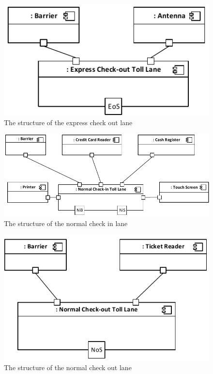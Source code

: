 \begin{figure}[H]
\centerline{\includegraphics[width=\textwidth]{img/composite_structure_diagrams/cscd_toll_lane_express_out}}
\caption{The structure of the express check out lane}
\label{fig:csd_tleo}
\end{figure}

\begin{figure}[H]
\centerline{\includegraphics[width=\textwidth]{img/composite_structure_diagrams/cscd_toll_lane_normal_in}}
\caption{The structure of the normal check in lane}
\label{fig:csd_tlni}
\end{figure}

\begin{figure}[H]
\centerline{\includegraphics[width=\textwidth]{img/composite_structure_diagrams/cscd_toll_lane_normal_out}}
\caption{The structure of the normal check out lane}
\label{fig:csd_tlno}
\end{figure}


